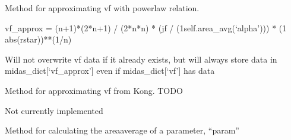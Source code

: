 \documentclass[letterpaper,10pt,english]{sphinxmanual}
\begin{document}
\begin{fulllineitems}

\begin{fulllineitems}
\label{\detokenize{api/MARIGOLD.Condition:MARIGOLD.Condition.approx_vf}}
\pysigstartsignatures
{}
\pysigstopsignatures
\sphinxAtStartPar
Method for approximating vf with power\sphinxhyphen{}law relation.

\sphinxAtStartPar
vf\_approx = (n+1)*(2*n+1) / (2*n*n) * (jf / (1\sphinxhyphen{}self.area\_avg(‘alpha’))) * (1 \sphinxhyphen{} abs(rstar))**(1/n)

\sphinxAtStartPar
Will not overwrite vf data if it already exists, but will always store data in
midas\_dict{[}‘vf\_approx’{]} even if midas\_dict{[}‘vf’{]} has data

\end{fulllineitems}


\begin{fulllineitems}
\label{\detokenize{api/MARIGOLD.Condition:MARIGOLD.Condition.approx_vf_Kong}}
\pysigstartsignatures
{}
\pysigstopsignatures
\sphinxAtStartPar
Method for approximating vf from Kong. TODO

\sphinxAtStartPar
Not currently implemented

\end{fulllineitems}


\begin{fulllineitems}
\label{\detokenize{api/MARIGOLD.Condition:MARIGOLD.Condition.area_avg}}
\pysigstartsignatures
{}
\pysigstopsignatures
\sphinxAtStartPar
Method for calculating the area\sphinxhyphen{}average of a parameter, “param”


\end{fulllineitems}
\end{fulllineitems}
\end{document}
